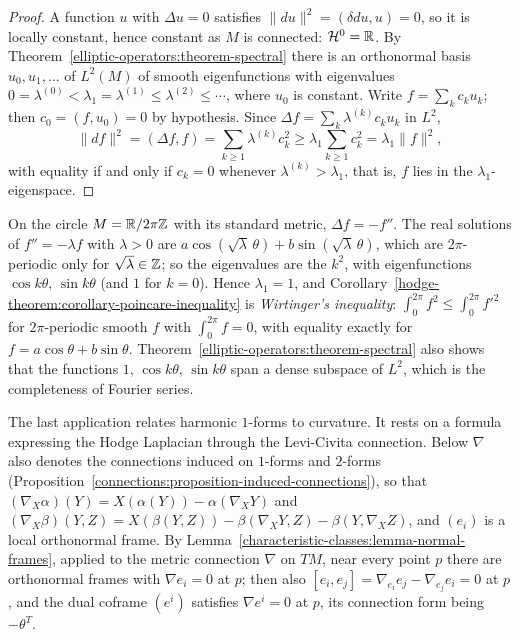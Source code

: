 \begin{proof}
A function $u$ with $\Delta u = 0$ satisfies $\|du\|^2 = (\delta du, u) = 0$, so it is locally constant, hence constant as $M$ is connected: $\mathcal{H}^0 = \mathbb{R}$. By Theorem~\ref{elliptic-operators:theorem-spectral} there is an
orthonormal basis $u_0, u_1, \ldots$ of $L^2(M)$ of smooth eigenfunctions with eigenvalues $0 = \lambda^{(0)} < \lambda_1 = \lambda^{(1)} \leq \lambda^{(2)} \leq \cdots$, where $u_0$ is constant. Write
$f = \sum_kc_ku_k$; then $c_0 = (f, u_0) = 0$ by hypothesis. Since $\Delta f = \sum_k\lambda^{(k)}c_ku_k$ in $L^2$,
\[
\|df\|^2 = (\Delta f, f) = \sum_{k \geq 1}\lambda^{(k)}c_k^2 \geq \lambda_1\sum_{k \geq 1}c_k^2 = \lambda_1\|f\|^2,
\]
with equality if and only if $c_k = 0$ whenever $\lambda^{(k)} > \lambda_1$, that is, $f$ lies in the $\lambda_1$-eigenspace.
\end{proof}

\begin{example}\label{hodge-theorem:example-wirtinger}
On the circle $M = \mathbb{R}/2\pi\mathbb{Z}$ with its standard metric, $\Delta f = -f''$. The real solutions of $f'' = -\lambda f$ with $\lambda > 0$ are $a\cos(\sqrt\lambda\,\theta) + b\sin(\sqrt\lambda\,\theta)$, which are
$2\pi$-periodic only for $\sqrt\lambda \in \mathbb{Z}$; so the eigenvalues are the $k^2$, with eigenfunctions $\cos k\theta$, $\sin k\theta$ (and $1$ for $k = 0$). Hence $\lambda_1 = 1$, and
Corollary~\ref{hodge-theorem:corollary-poincare-inequality} is \emph{Wirtinger's inequality}: $\int_0^{2\pi}f^2 \leq \int_0^{2\pi}f'^2$ for $2\pi$-periodic smooth $f$ with $\int_0^{2\pi}f = 0$, with equality exactly for
$f = a\cos\theta + b\sin\theta$. Theorem~\ref{elliptic-operators:theorem-spectral} also shows that the functions $1$, $\cos k\theta$, $\sin k\theta$ span a dense subspace of $L^2$, which is the completeness of Fourier series.
\end{example}

The last application relates harmonic $1$-forms to curvature. It rests on a formula expressing the Hodge Laplacian through the Levi-Civita connection. Below $\nabla$ also denotes the connections
induced on $1$-forms and $2$-forms (Proposition~\ref{connections:proposition-induced-connections}), so that $(\nabla_X\alpha)(Y) = X(\alpha(Y)) - \alpha(\nabla_XY)$ and
$(\nabla_X\beta)(Y, Z) = X(\beta(Y, Z)) - \beta(\nabla_XY, Z) - \beta(Y, \nabla_XZ)$, and $(e_i)$ is a local orthonormal frame. By Lemma~\ref{characteristic-classes:lemma-normal-frames}, applied to the
metric connection $\nabla$ on $TM$, near every point $p$ there are orthonormal frames with $\nabla e_i = 0$ at $p$; then also $[e_i, e_j] = \nabla_{e_i}e_j - \nabla_{e_j}e_i = 0$ at $p$, and the dual coframe
$(e^i)$ satisfies $\nabla e^i = 0$ at $p$, its connection form being $-\theta^T$.

